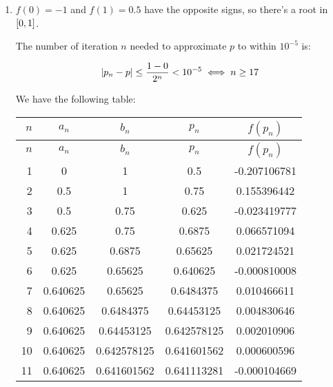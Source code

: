 \documentclass[../../Assignments.tex]{subfiles}
\begin{document}
\begin{solution}
    \begin{enumerate}[label = (\alph*)]
        \item \(f(0) = -1\) and \(f(1) = \num{0.5}\) have the opposite signs, so
            there's a root in \(\interval{0}{1}\).

            The number of iteration \(n\) needed to approximate \(p\) to within
            \(10^{-5}\) is:

            \[\abs{p_n - p} \leq \frac{1 - 0}{2^n} < 10^{-5} \iff n \geq 17\]

            We have the following table:

            \begin{longtable}{r S[table-format=1.9] S[table-format=1.9] S[table-format=1.9] S[table-format=-1.9]}
                \toprule
                \(n\)  &   {\(a_n\)}   &   {\(b_n\)}   &   {\(p_n\)}   &  {\(f(p_n)\)}  \\
                \midrule
                \endfirsthead
                \toprule
                \(n\)  &   {\(a_n\)}   &   {\(b_n\)}   &   {\(p_n\)}   &  {\(f(p_n)\)}  \\
                \midrule
                  &  0            &  1            &  0.5          &  -0.207106781  \\
                    2  &  0.5          &  1            &  0.75         &   0.155396442  \\
                    3  &  0.5          &  0.75         &  0.625        &  -0.023419777  \\
                    4  &  0.625        &  0.75         &  0.6875       &   0.066571094  \\
                    5  &  0.625        &  0.6875       &  0.65625      &   0.021724521  \\
                    6  &  0.625        &  0.65625      &  0.640625     &  -0.000810008  \\
                    7  &  0.640625     &  0.65625      &  0.6484375    &   0.010466611  \\
                    8  &  0.640625     &  0.6484375    &  0.64453125   &   0.004830646  \\
                    9  &  0.640625     &  0.64453125   &  0.642578125  &   0.002010906  \\
                   10  &  0.640625     &  0.642578125  &  0.641601562  &   0.000600596  \\
                   11  &  0.640625     &  0.641601562  &  0.641113281  &  -0.000104669  \\

\end{longtable}
\end{enumerate}
\end{solution}
\end{document}

